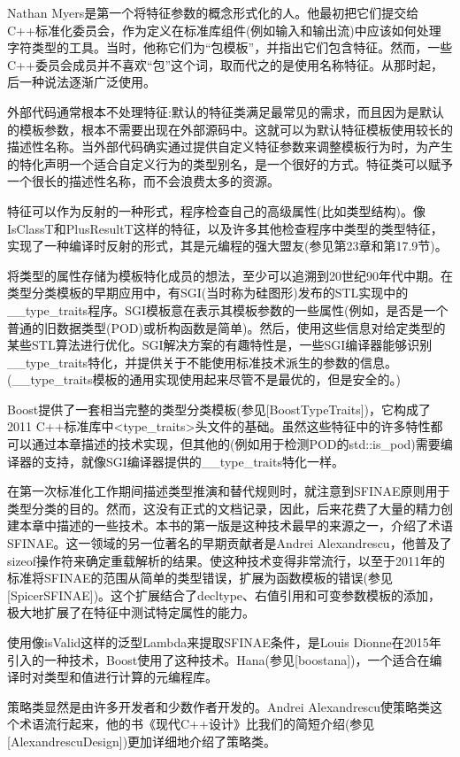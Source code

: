 Nathan Myers是第一个将特征参数的概念形式化的人。他最初把它们提交给C++标准化委员会，作为定义在标准库组件(例如输入和输出流)中应该如何处理字符类型的工具。当时，他称它们为“包模板”，并指出它们包含特征。然而，一些C++委员会成员并不喜欢“包”这个词，取而代之的是使用名称特征。从那时起，后一种说法逐渐广泛使用。

外部代码通常根本不处理特征:默认的特征类满足最常见的需求，而且因为是默认的模板参数，根本不需要出现在外部源码中。这就可以为默认特征模板使用较长的描述性名称。当外部代码确实通过提供自定义特征参数来调整模板行为时，为产生的特化声明一个适合自定义行为的类型别名，是一个很好的方式。特征类可以赋予一个很长的描述性名称，而不会浪费太多的资源。

特征可以作为反射的一种形式，程序检查自己的高级属性(比如类型结构)。像IsClassT和PlusResultT这样的特征，以及许多其他检查程序中类型的类型特征，实现了一种编译时反射的形式，其是元编程的强大盟友(参见第23章和第17.9节)。

将类型的属性存储为模板特化成员的想法，至少可以追溯到20世纪90年代中期。在类型分类模板的早期应用中，有SGI(当时称为硅图形)发布的STL实现中的\_\_type\_traits程序。SGI模板意在表示其模板参数的一些属性(例如，是否是一个普通的旧数据类型(POD)或析构函数是简单)。然后，使用这些信息对给定类型的某些STL算法进行优化。SGI解决方案的有趣特性是，一些SGI编译器能够识别\_\_type\_traits特化，并提供关于不能使用标准技术派生的参数的信息。(\_\_type\_traits模板的通用实现使用起来尽管不是最优的，但是安全的。)

Boost提供了一套相当完整的类型分类模板(参见[BoostTypeTraits])，它构成了2011 C++标准库中<type\_traits>头文件的基础。虽然这些特征中的许多特性都可以通过本章描述的技术实现，但其他的(例如用于检测POD的std::is\_pod)需要编译器的支持，就像SGI编译器提供的\_\_type\_traits特化一样。

在第一次标准化工作期间描述类型推演和替代规则时，就注意到SFINAE原则用于类型分类的目的。然而，这没有正式的文档记录，因此，后来花费了大量的精力创建本章中描述的一些技术。本书的第一版是这种技术最早的来源之一，介绍了术语SFINAE。这一领域的另一位著名的早期贡献者是Andrei Alexandrescu，他普及了sizeof操作符来确定重载解析的结果。使这种技术变得非常流行，以至于2011年的标准将SFINAE的范围从简单的类型错误，扩展为函数模板的错误(参见[SpicerSFINAE])。这个扩展结合了decltype、右值引用和可变参数模板的添加，极大地扩展了在特征中测试特定属性的能力。

使用像isValid这样的泛型Lambda来提取SFINAE条件，是Louis Dionne在2015年引入的一种技术，Boost使用了这种技术。Hana(参见[boostana])，一个适合在编译时对类型和值进行计算的元编程库。

策略类显然是由许多开发者和少数作者开发的。Andrei Alexandrescu使策略类这个术语流行起来，他的书《现代C++设计》比我们的简短介绍(参见[AlexandrescuDesign])更加详细地介绍了策略类。